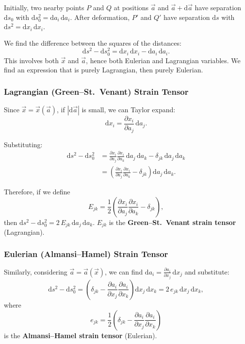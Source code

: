 \documentclass[11pt,a4paper]{article}
\newcommand{\pdx}[2]{\frac{\partial #1}{\partial #2}}
\newcommand{\xv}{\vec{x}}
\begin{document}
Initially, two nearby points $P$ and $Q$ at positions $\vec{a}$ and $\vec{a}+\mathrm{d}\vec{a}$ have separation $\mathrm{d}s_0$ with $\mathrm{d}s_0^2 = \mathrm{d}a_i\,\mathrm{d}a_i$. After deformation, $P'$ and $Q'$ have separation $\mathrm{d}s$ with $\mathrm{d}s^2 = \mathrm{d}x_i\,\mathrm{d}x_i$.

We find the difference between the squares of the distances:
\[
    \mathrm{d}s^2 - \mathrm{d}s_0^2 = \mathrm{d}x_i\,\mathrm{d}x_i - \mathrm{d}a_i\,\mathrm{d}a_i.
\]
This involves both $\xv$ and $\vec{a}$, hence both Eulerian and Lagrangian variables. We find an expression that is purely Lagrangian, then purely Eulerian.

\subsubsection{Lagrangian (Green--St.\ Venant) Strain Tensor}

Since $\xv = \xv(\vec{a})$, if $|\mathrm{d}\vec{a}|$ is small, we can Taylor expand:
\[
    \mathrm{d}x_i = \pdx{x_i}{a_j}\,\mathrm{d}a_j.
\]

Substituting:
\begin{align*}
    \mathrm{d}s^2 - \mathrm{d}s_0^2
    &= \pdx{x_i}{a_j}\pdx{x_i}{a_k}\,\mathrm{d}a_j\,\mathrm{d}a_k - \delta_{jk}\,\mathrm{d}a_j\,\mathrm{d}a_k \\
    &= \left(\pdx{x_i}{a_j}\pdx{x_i}{a_k} - \delta_{jk}\right)\mathrm{d}a_j\,\mathrm{d}a_k.
\end{align*}

Therefore, if we define
\[
    \boxed{E_{jk} = \frac{1}{2}\left(\pdx{x_i}{a_j}\pdx{x_i}{a_k} - \delta_{jk}\right),}
\]
then $\mathrm{d}s^2 - \mathrm{d}s_0^2 = 2\,E_{jk}\,\mathrm{d}a_j\,\mathrm{d}a_k$. $E_{jk}$ is the \textbf{Green--St.\ Venant strain tensor} (Lagrangian).

\subsubsection{Eulerian (Almansi--Hamel) Strain Tensor}

Similarly, considering $\vec{a} = \vec{a}(\xv)$, we can find $\mathrm{d}a_i = \frac{\partial a_i}{\partial x_j}\,\mathrm{d}x_j$ and substitute:
\[
    \mathrm{d}s^2 - \mathrm{d}s_0^2
    = \left(\delta_{jk} - \pdx{a_i}{x_j}\pdx{a_i}{x_k}\right)\mathrm{d}x_j\,\mathrm{d}x_k
    = 2\,e_{jk}\,\mathrm{d}x_j\,\mathrm{d}x_k,
\]
where
\[
    \boxed{e_{jk} = \frac{1}{2}\left(\delta_{jk} - \pdx{a_i}{x_j}\pdx{a_i}{x_k}\right)}
\]
is the \textbf{Almansi--Hamel strain tensor} (Eulerian).
\end{document}
